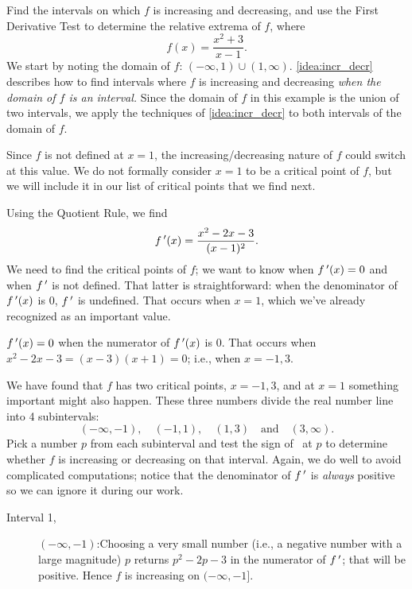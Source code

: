 \begin{example}\label{ex_incr2}%
Find the intervals on which $f$ is increasing and decreasing, and use the First Derivative Test to determine the relative extrema of $f$,  where
\[f(x) = \frac{x^2+3}{x-1}.\]
\solution
We start by noting the domain of $f$: $(-\infty,1)\cup(1,\infty)$. \autoref{idea:incr_decr} describes how to find intervals where $f$ is increasing and decreasing \emph{when the domain of $f$ is an interval.} Since the domain of $f$ in this example is the union of two intervals, we apply the techniques of \autoref{idea:incr_decr} to both intervals of the domain of $f$.

Since $f$ is not defined at $x=1$, the increasing/decreasing nature of $f$ could switch at this value. We do not formally consider $x=1$ to be a critical point of $f$, but we will include it in our list of critical points that we find next.

Using the Quotient Rule, we find
\[f\,'(x) = \frac{x^2-2x-3}{(x-1)^2}.\]
We need to find the critical points of $f$; we want to know when $f\,'(x)=0$ and when $f\,'$ is not defined. That latter is straightforward: when the denominator of $f\,'(x)$ is 0, $f\,'$ is undefined. That occurs when $x=1$, which we've already recognized as an important value.


$f\,'(x)=0$ when the numerator of $f\,'(x)$ is 0. That occurs when $x^2-2x-3 = (x-3)(x+1) = 0$; i.e., when $x=-1,3$. 

We have found that $f$ has two critical points, $x=-1,3$, and at $x=1$ something important might also happen. These three numbers divide the real number line into 4 subintervals:
\[(-\infty,-1), \quad (-1, 1), \quad (1,3) \quad \text{and} \quad (3,\infty).\]
Pick a number $p$ from each subinterval and test the sign of \fp\ at $p$ to determine whether $f$ is increasing or decreasing on that interval. Again, we do well to avoid complicated computations; notice that the denominator of $f\,'$ is \emph{always} positive so we can ignore it during our work.

\begin{description}%
\item[Interval 1,] $(-\infty,-1)$:\quad  Choosing a very small number (i.e., a negative number with a large magnitude) $p$ returns $p^2-2p-3$ in the numerator of $f\,'$; that will be positive. Hence $f$ is increasing on $(-\infty,-1]$.


\end{description}
\end{example}
